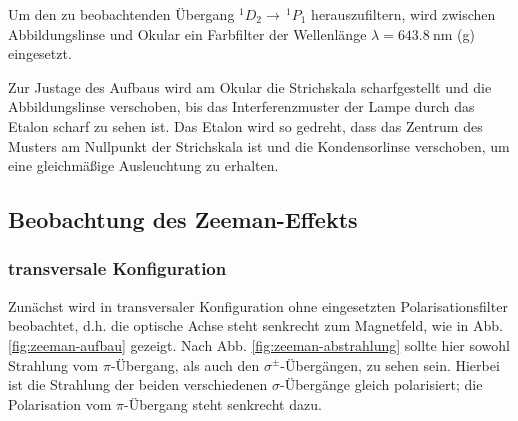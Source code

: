 \documentclass{article}
\begin{document}
\begin{multicols}{2}
Um den zu beobachtenden Übergang $^1D_2 \rightarrow\,^1P_1$ herauszufiltern, wird zwischen Abbildungslinse und
Okular ein Farbfilter der Wellenlänge $\lambda=\SI{643.8}{\nm}$ \cite{Anleitung} (g) eingesetzt.




Zur Justage des Aufbaus wird am Okular die Strichskala scharfgestellt und
die Abbildungslinse verschoben, bis das Interferenzmuster der Lampe durch das Etalon scharf zu sehen ist.
Das Etalon wird so gedreht, dass das Zentrum des Musters am Nullpunkt der Strichskala ist
und die Kondensorlinse verschoben, um eine gleichmäßige Ausleuchtung zu erhalten.

\subsection{Beobachtung des Zeeman-Effekts}
\subsubsection{transversale Konfiguration}
Zunächst wird in transversaler Konfiguration ohne eingesetzten Polarisationsfilter beobachtet,
d.h. die optische Achse steht senkrecht zum Magnetfeld, wie in Abb. \ref{fig:zeeman-aufbau} gezeigt.
Nach Abb. \ref{fig:zeeman-abstrahlung} sollte hier sowohl Strahlung vom $\pi$-Übergang,
als auch den $\sigma^\pm$-Übergängen, zu sehen sein.
Hierbei ist die Strahlung der beiden verschiedenen $\sigma$-Übergänge gleich polarisiert;
die Polarisation vom $\pi$-Übergang steht senkrecht dazu.


\end{multicols}
\end{document}
